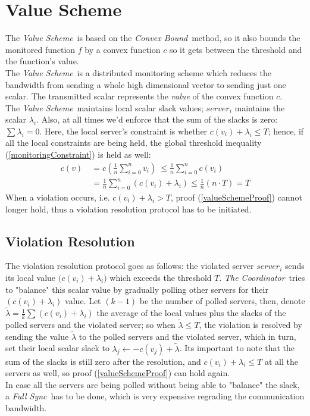 \documentclass[10pt, conference]{IEEEtran}
\newcommand{\valueScheme}{\textit{Value Scheme}}
\newcommand{\fullSync}{\textit{Full Sync}}
\newcommand{\convexBound}{\textit{Convex Bound}}
\newcommand{\TheCoordinator}{\textit{The Coordinator}}
\begin{document}
\section{Value Scheme}
The \valueScheme \ is based on the \convexBound \ method, so it also bounds the monitored function $f$ by a convex function $c$ so it gets between the threshold and the function's value. \\ 
The \valueScheme \ is a distributed monitoring scheme which reduces the bandwidth from sending a whole high dimensional vector to sending just one scalar. The transmitted scalar represents the \textit{value} of the convex function $c$.\\
The \valueScheme \ maintains local scalar slack values; $server_i$ maintains the scalar $\lambda _i$. Also, at all times we'd enforce that the sum of the slacks is zero: ${\sum{\lambda _i} = 0}$. Here, the local server's constraint is whether ${c(v_i) + \lambda _i \leq T}$; hence, if all the local constraints are being held, the global threshold inequality (\ref{monitoringConstraint}) is held as well:
\begin{equation}
\label{valueSchemeProof}
\begin{aligned}
 c(v)  \
	    &=   c\left(\frac{1}{n} \sum\limits_{i=0}^{n}{v_i}\right)  \
       \leq   \frac{1}{n} \sum\limits_{i=0}^{n}c(v_i) \\
        &=    \frac{1}{n} \sum\limits_{i=0}^{n}{(c(v_i) + \lambda _i)}
       \leq   \frac{1}{n}(n \cdot T)
        = T
\end{aligned}
\end{equation}
When a violation occurs, i.e. ${c(v_i) + \lambda _i > T}$, proof (\ref{valueSchemeProof}) cannot longer hold, thus a violation resolution protocol has to be initiated.
\subsection{Violation Resolution}
The violation resolution protocol goes as follows: the violated server $server_i$ sends its local value ${(c(v_i) + \lambda _i})$ which exceeds the threshold $T$. \TheCoordinator \ tries to "balance" this scalar value by gradually polling other servers for their ${(c(v_i) + \lambda _i)}$ value. Let ${(k-1)}$ be the number of polled servers, then, denote ${\widetilde{\lambda} = \frac{1}{k}\sum{(c(v_i) + \lambda _i)}}$ the average of the local values plus the slacks of the polled servers and the violated server; so when ${\widetilde{\lambda} \leq T}$, the violation is resolved by sending the value $\widetilde{\lambda}$ to the polled servers and the violated server, which in turn, set their local scalar slack to ${\lambda _j \leftarrow -c(v_j) + \widetilde{\lambda} }$. Its important to note that the sum of the slacks is still zero after the resolution, and ${c(v_i) + \lambda _i \leq T}$ at all the servers as well, so proof (\ref{valueSchemeProof}) can hold again. \\
In case all the servers are being polled without being able to "balance" the slack, a \fullSync \ has to be done, which is very expensive regrading the communication bandwidth.
\end{document}
